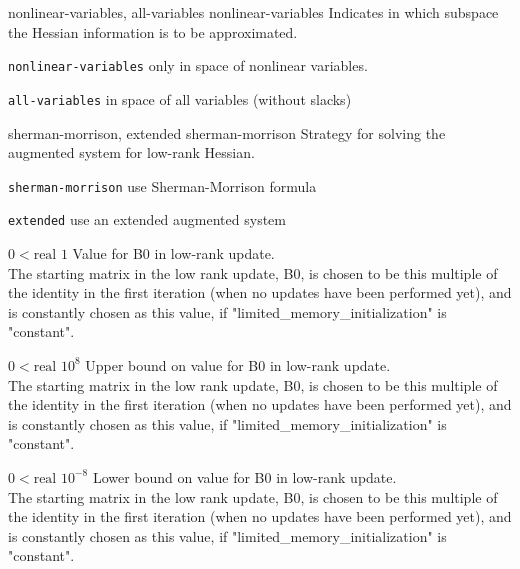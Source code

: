 %
{\ttfamily nonlinear-variables, all-variables}%
{nonlinear-variables}%
{Indicates in which subspace the Hessian information is to be approximated.}%
{\begin{list}{}{
\setlength{\parsep}{0em}
\setlength{\leftmargin}{5ex}
\setlength{\labelwidth}{2ex}
\setlength{\itemindent}{0ex}
\setlength{\topsep}{0pt}}
\item[\texttt{nonlinear-variables}] only in space of nonlinear variables.
\item[\texttt{all-variables}] in space of all variables (without slacks)
\end{list}
}

%
{\ttfamily sherman-morrison, extended}%
{sherman-morrison}%
{Strategy for solving the augmented system for low-rank Hessian.}%
{\begin{list}{}{
\setlength{\parsep}{0em}
\setlength{\leftmargin}{5ex}
\setlength{\labelwidth}{2ex}
\setlength{\itemindent}{0ex}
\setlength{\topsep}{0pt}}
\item[\texttt{sherman-morrison}] use Sherman-Morrison formula
\item[\texttt{extended}] use an extended augmented system
\end{list}
}

%
{$0<\textrm{real}$}%
{$1$}%
{Value for B0 in low-rank update.\\
The starting matrix in the low rank update, B0, is chosen to be this multiple of the identity in the first iteration (when no updates have been performed yet), and is constantly chosen as this value, if "limited\_memory\_initialization" is "constant".}%
{}

%
{$0<\textrm{real}$}%
{$10^{  8}$}%
{Upper bound on value for B0 in low-rank update.\\
The starting matrix in the low rank update, B0, is chosen to be this multiple of the identity in the first iteration (when no updates have been performed yet), and is constantly chosen as this value, if "limited\_memory\_initialization" is "constant".}%
{}

%
{$0<\textrm{real}$}%
{$10^{- 8}$}%
{Lower bound on value for B0 in low-rank update.\\
The starting matrix in the low rank update, B0, is chosen to be this multiple of the identity in the first iteration (when no updates have been performed yet), and is constantly chosen as this value, if "limited\_memory\_initialization" is "constant".}%
{}

